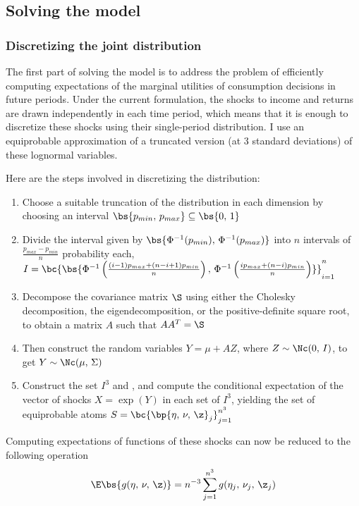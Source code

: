 \subsection{Solving the model}

\subsubsection{Discretizing the joint distribution}

The first part of solving the model is to address the problem of efficiently computing expectations of the marginal utilities of consumption decisions in future periods. Under the current formulation, the shocks to income and returns are drawn independently in each time period, which means that it is enough to discretize these shocks using their single-period distribution. I use an equiprobable approximation of a truncated version (at 3 standard deviations) of these lognormal variables.

Here are the steps involved in discretizing the distribution:
\begin{enumerate}
    \item Choose a suitable truncation of the distribution in each dimension by choosing an interval $\bs{p_{min},\,p_{max}} \subseteq \bs{0,\,1}$
    \item Divide the interval given by $\bs{\Phi^{-1}(p_{min}),\,\Phi^{-1}(p_{max})}$ into $n$ intervals of $\frac{p_{max} - p_{min}}{n}$ probability each, $I = \bc{\bs{\Phi^{-1}\left(\frac{(i - 1)p_{max} + (n - i + 1)p_{min}}{n}\right),\,\Phi^{-1}\left(\frac{ip_{max} + (n - i)p_{min}}{n}\right)}}_{i=1}^{n}$
    \item Decompose the covariance matrix $\S$ using either the Cholesky decomposition, the eigendecomposition, or the positive-definite square root, to obtain a matrix $A$ such that $AA^T = \S$
    \item Then construct the random variables $Y = \mu + AZ$, where $Z \sim \Nc(0,\,I)$, to get $Y \sim \Nc(\mu,\,\Sigma)$
    \item Construct the set $I^3$ and , and compute the conditional expectation of the vector of shocks $X = \exp(Y)$ in each set of $I^3$, yielding the set of equiprobable atoms $S = \bc{\bp{\eta,\,\nu,\,\z}_{j}}_{j=1}^{n^3}$
\end{enumerate}

Computing expectations of functions of these shocks can now be reduced to the following operation
\[
\E\bs{g(\eta,\,\nu,\,\z)} = n^{-3}\sum_{j=1}^{n^3}g(\eta_j,\,\nu_j,\,\z_j)
\]

